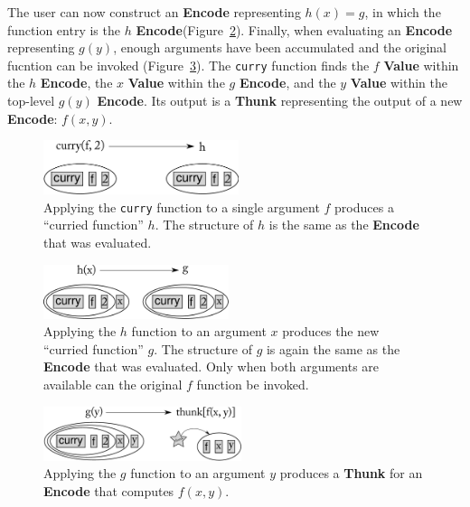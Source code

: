 \documentclass{article}
\newcommand{\valuex}{\textbf{Value}\xspace}
\newcommand{\encode}{\textbf{Encode}\xspace}
\newcommand{\thunk}{\textbf{Thunk}\xspace}
\begin{document}
The user can now construct an \encode representing $h(x) = g$, in
which the function entry is the $h$ \encode (Figure~\ref{fig:curry2}).
Finally, when evaluating an \encode representing $g(y)$, enough
arguments have been accumulated and the original fucntion can be
invoked (Figure~\ref{fig:curry3}). The \texttt{curry} function finds
the $f$ \valuex within the $h$ \encode, the $x$ \valuex within the $g$
\encode, and the $y$ \valuex within the top-level $g(y)$ \encode.  Its
output is a \thunk representing the output of a new \encode: $f(x,y)$.

\begin{figure}[h!]
  \begin{centering}
    \includegraphics[height=60px]{curry1.pdf}

  \end{centering}

  \caption{Applying the \texttt{curry} function to a single argument $f$ produces a ``curried function'' $h$. The structure of $h$ is the same as the \encode that was evaluated.}
  \label{fig:curry1}
\end{figure}

\enlargethispage{3 \baselineskip}

\begin{figure}[h!]
  \begin{centering}
    \includegraphics[height=60px]{curry2.pdf}

  \end{centering}

  \caption{Applying the $h$ function to an argument $x$ produces the new ``curried function'' $g$. The structure of $g$ is again the same as the \encode that was evaluated. Only
  when both arguments are available can the original $f$ function be invoked.}
  \label{fig:curry2}
\end{figure}

\begin{figure}[h!]
  \begin{centering}
    \includegraphics[height=60px]{curry3.pdf}

  \end{centering}

  \caption{Applying the $g$ function to an argument $y$ produces a \thunk for an \encode that computes $f(x, y)$.}
  \label{fig:curry3}
\end{figure}
\end{document}
